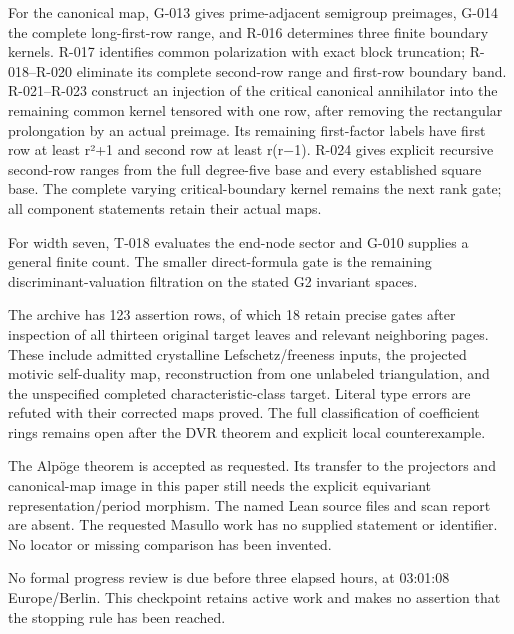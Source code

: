 \documentclass[
  10pt,
]{article}
\begin{document}
For the canonical map, G-013 gives prime-adjacent semigroup preimages,
G-014 the complete long-first-row range, and R-016 determines three
finite boundary kernels. R-017 identifies common polarization with exact
block truncation; R-018--R-020 eliminate its complete second-row range
and first-row boundary band. R-021--R-023 construct an injection of the
critical canonical annihilator into the remaining common kernel tensored
with one row, after removing the rectangular prolongation by an actual
preimage. Its remaining first-factor labels have first row at least r²+1
and second row at least r(r−1). R-024 gives explicit recursive
second-row ranges from the full degree-five base and every established
square base. The complete varying critical-boundary kernel remains the
next rank gate; all component statements retain their actual maps.

For width seven, T-018 evaluates the end-node sector and G-010 supplies
a general finite count. The smaller direct-formula gate is the remaining
discriminant-valuation filtration on the stated G2 invariant spaces.

The archive has 123 assertion rows, of which 18 retain precise gates
after inspection of all thirteen original target leaves and relevant
neighboring pages. These include admitted crystalline Lefschetz/freeness
inputs, the projected motivic self-duality map, reconstruction from one
unlabeled triangulation, and the unspecified completed
characteristic-class target. Literal type errors are refuted with their
corrected maps proved. The full classification of coefficient rings
remains open after the DVR theorem and explicit local counterexample.

The Alpöge theorem is accepted as requested. Its transfer to the
projectors and canonical-map image in this paper still needs the
explicit equivariant representation/period morphism. The named Lean
source files and scan report are absent. The requested Masullo work has
no supplied statement or identifier. No locator or missing comparison
has been invented.

No formal progress review is due before three elapsed hours, at 03:01:08
Europe/Berlin. This checkpoint retains active work and makes no
assertion that the stopping rule has been reached.
\end{document}
